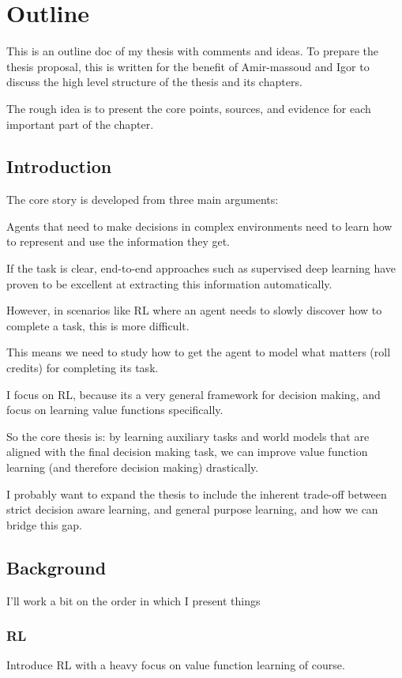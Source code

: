 \chapter*{Outline}

This is an outline doc of my thesis with comments and ideas.
To prepare the thesis proposal, this is written for the benefit of Amir-massoud and Igor to discuss the high level structure of the thesis and its chapters.

The rough idea is to present the core points, sources, and evidence for each important part of the chapter.

\section{Introduction}

The core story is developed from three main arguments:

Agents that need to make decisions in complex environments need to learn how to represent and use the information they get.

If the task is clear, end-to-end approaches such as supervised deep learning have proven to be excellent at extracting this information automatically.

However, in scenarios like RL where an agent needs to slowly discover how to complete a task, this is more difficult.

This means we need to study how to get the agent to model what matters (roll credits) for completing its task.

I focus on RL, because its a very general framework for decision making, and focus on learning value functions specifically.

So the core thesis is: by learning auxiliary tasks and world models that are aligned with the final decision making task, we can improve value function learning (and therefore decision making) drastically.

I probably want to expand the thesis to include the inherent trade-off between strict decision aware learning, and general purpose learning, and how we can bridge this gap.

\section{Background}

I'll work a bit on the order in which I present things

\subsection{RL}
Introduce RL with a heavy focus on value function learning of course.

